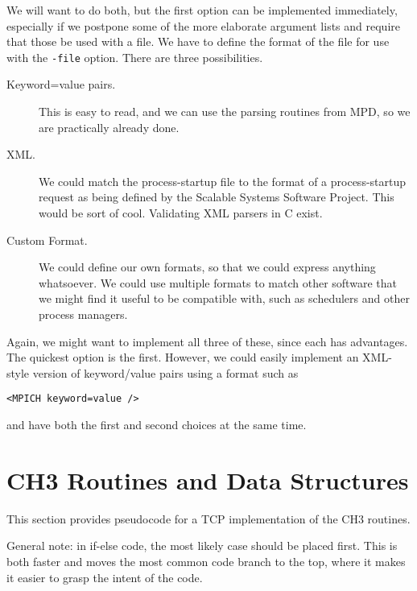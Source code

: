\documentclass{article}
\def\code{\begingroup\makeustext\eatcode}
\def\eatcode#1{\texttt{#1}\endgroup}
\begin{document}
We will want to do both, but the first option can be implemented
immediately, especially if we postpone some of the more elaborate argument
lists and require that those be used with a file.  We have to define the
format of the file for use with the \code{-file} option.  There are three
possibilities.
\begin{description}
\item[Keyword=value pairs.] This is easy to read, and we can use the
  parsing routines from MPD, so we are practically already done.
\item[XML.] We could match the process-startup file to the format of a
  process-startup request as being defined by the Scalable Systems Software
  Project.  This would be sort of cool.  Validating XML parsers in C exist.
\item[Custom Format.] We could define our own formats, so that we could express
  anything whatsoever.  We could use multiple formats to match other software
  that we might find it useful to be compatible with, such as schedulers and
  other process managers.
\end{description}

Again, we might want to implement all three of these, since each has
advantages.  The quickest option is the first.  However, we could easily
implement an XML-style version of keyword/value pairs using a format such as
\begin{verbatim}
<MPICH keyword=value />
\end{verbatim}
and have both the first and second choices at the same time.


\appendix
\section{CH3 Routines and Data Structures}
\label{app:ch3}

This section provides pseudocode for a TCP implementation of the CH3
routines.

General note: in if-else code, the most likely case should be placed first.
This is both faster and moves the most common code branch to the top, where it
makes it easier to grasp the intent of the code.
\end{document}
